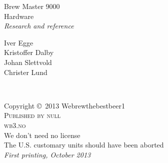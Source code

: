\documentclass[11pt,fleqn,openany]{book} %
\begin{document}

\begingroup
\thispagestyle{empty}
\centering
\vspace*{9cm}
\par\normalfont\fontsize{35}{35}\sffamily\selectfont
\Huge Brew Master 9000\\
Hardware\\
\textit{Research and reference}\par %
\vspace*{1cm}
{\Large Iver Egge\\
Kristoffer Dalby\\
Johan Slettvold\\
Christer Lund\\} %
\endgroup


\newpage
~\vfill
\thispagestyle{empty}

\noindent Copyright \copyright\ 2013 Webrewthebestbeer1\\ %

\noindent \textsc{Published by null}\\ %

\noindent \textsc{wb3.no}\\ %

\noindent We don't need no license\\ %

\noindent The U.S. customary units should have been aborted\\

\noindent \textit{First printing, October 2013} %



\pagestyle{empty} %
\end{document}
